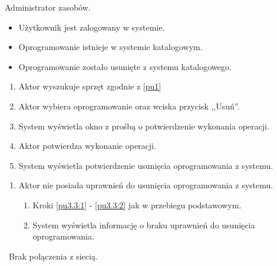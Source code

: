 Administrator zasobów.

\begin{itemize}
\item Użytkownik jest zalogowany w systemie.
\item Oprogramowanie istnieje w systemie katalogowym.
\end{itemize}

\begin{itemize}
\item Oprogramowanie zostało usunięte z systemu katalogowego.
\end{itemize}

\begin{enumerate}
\item \label{pu3.3:1} Aktor wyszukuje sprzęt zgodnie z \ref{pu1}
\item \label{pu3.3:2} Aktor wybiera oprogramowanie oraz wciska przycisk ,,Usuń''.
\item System wyświetla okno z prośbą o potwierdzenie wykonania operacji.
\item Aktor potwierdza wykonanie operacji.
\item System wyświetla potwierdzenie usunięcia oprogramowania z systemu.
\end{enumerate}

\begin{enumerate}
\item Aktor nie posiada uprawnień do usunięcia oprogramowania z systemu.
	\begin{enumerate}[label*=\arabic*.]
		\item Kroki \ref{pu3.3:1} - \ref{pu3.3:2} jak w przebiegu podstawowym.
		\item System wyświetla informację o braku uprawnień do usunięcia oprogramowania.
	\end{enumerate}
\end{enumerate}

\
Brak połączenia z siecią.

